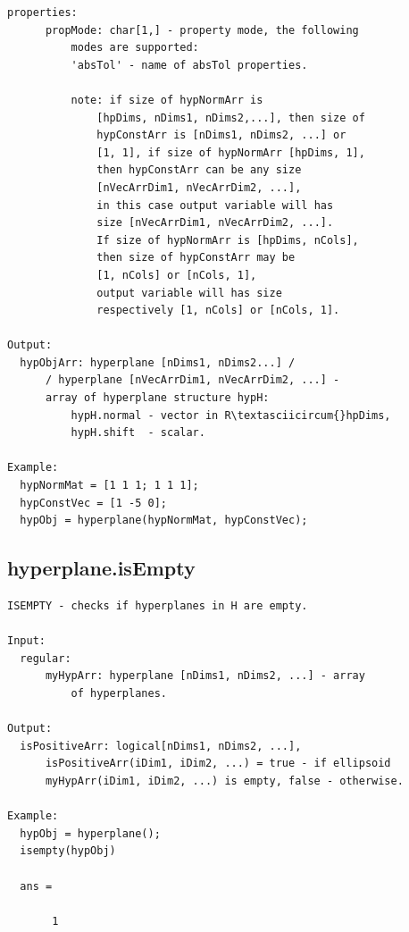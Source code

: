\documentclass[letterpaper,10pt,english]{sphinxmanual}
\begin{document}
\begin{Verbatim}[commandchars=\\\{\}]
    properties:
      propMode: char[1,] - property mode, the following
          modes are supported:
          'absTol' - name of absTol properties.

          note: if size of hypNormArr is
              [hpDims, nDims1, nDims2,...], then size of
              hypConstArr is [nDims1, nDims2, ...] or
              [1, 1], if size of hypNormArr [hpDims, 1],
              then hypConstArr can be any size
              [nVecArrDim1, nVecArrDim2, ...],
              in this case output variable will has
              size [nVecArrDim1, nVecArrDim2, ...].
              If size of hypNormArr is [hpDims, nCols],
              then size of hypConstArr may be
              [1, nCols] or [nCols, 1],
              output variable will has size
              respectively [1, nCols] or [nCols, 1].

Output:
  hypObjArr: hyperplane [nDims1, nDims2...] /
      / hyperplane [nVecArrDim1, nVecArrDim2, ...] -
      array of hyperplane structure hypH:
          hypH.normal - vector in R\textasciicircum{}hpDims,
          hypH.shift  - scalar.

Example:
  hypNormMat = [1 1 1; 1 1 1];
  hypConstVec = [1 -5 0];
  hypObj = hyperplane(hypNormMat, hypConstVec);
\end{Verbatim}


\subsection{hyperplane.isEmpty}
\label{chap_functions:hyperplane-isempty}
\begin{Verbatim}[commandchars=\\\{\}]
ISEMPTY - checks if hyperplanes in H are empty.

Input:
  regular:
      myHypArr: hyperplane [nDims1, nDims2, ...] - array
          of hyperplanes.

Output:
  isPositiveArr: logical[nDims1, nDims2, ...],
      isPositiveArr(iDim1, iDim2, ...) = true - if ellipsoid
      myHypArr(iDim1, iDim2, ...) is empty, false - otherwise.

Example:
  hypObj = hyperplane();
  isempty(hypObj)

  ans =

       1
\end{Verbatim}
\end{document}
